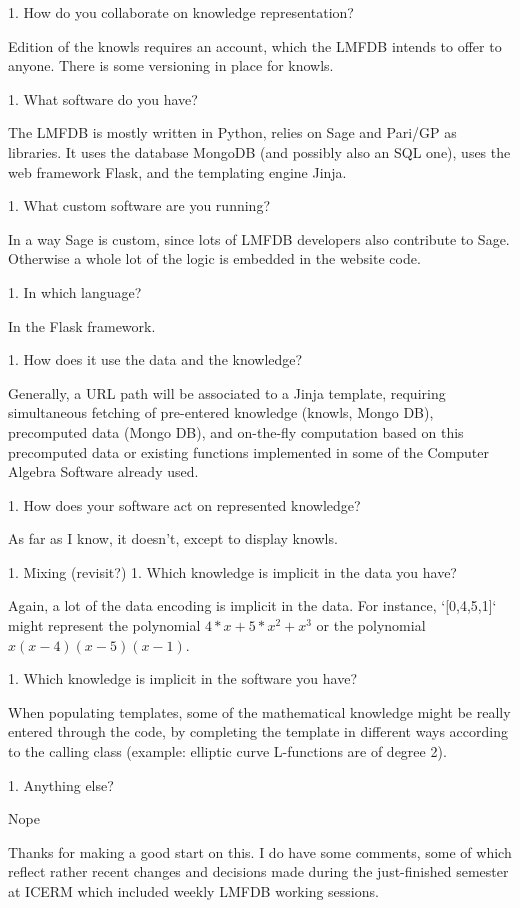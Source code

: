 \documentclass{deliverablereport}
\begin{document}
 1. How do you collaborate on knowledge representation?

   Edition of the knowls requires an account, which the LMFDB intends to offer to anyone. There is some versioning in place for knowls.

1. What software do you have?

 The LMFDB is mostly written in Python, relies on Sage and Pari/GP as libraries. It uses the database MongoDB (and possibly also an SQL one), uses the web framework Flask, and the templating engine Jinja.

 1. What custom software are you running?

   In a way Sage is custom, since lots of LMFDB developers also contribute to Sage. Otherwise a whole lot of the logic is embedded in the website code.

 1. In which language?

   In the Flask framework.

 1. How does it use the data and the knowledge?

   Generally, a URL path will be associated to a Jinja template, requiring simultaneous fetching of pre-entered knowledge (knowls, Mongo DB), precomputed data (Mongo DB), and on-the-fly computation based on this precomputed data or existing functions implemented in some of the Computer Algebra Software already used.

 1. How does your software act on represented knowledge?

   As far as I know, it doesn't, except to display knowls.

1. Mixing (revisit?)
 1. Which knowledge is implicit in the data you have?

   Again, a lot of the data encoding is implicit in the data. For instance, `[0,4,5,1]` might represent the polynomial $4*x+5*x^2+x^3$ or the polynomial $x(x-4)(x-5)(x-1)$.

 1. Which knowledge is implicit in the software you have?

   When populating templates, some of the mathematical knowledge might be really entered through the code, by completing the template in different ways according to the calling class (example: elliptic curve L-functions are of degree 2).

1. Anything else?

 Nope

Thanks for making a good start on this.  I do have some comments, some of
which reflect rather recent changes and decisions made during the
just-finished semester at ICERM which included weekly LMFDB working
sessions.
\end{document}
